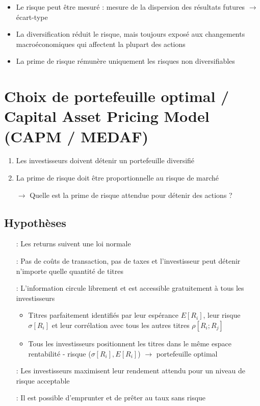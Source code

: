 \begin{itemize}
    \item Le risque peut être mesuré : mesure de la dispersion des résultats futures $\rightarrow$ écart-type
    \item La diversification réduit le risque, mais toujours exposé aux changements macroéconomiques qui affectent la plupart des actions
    \item La prime de risque rémunère uniquement les risques non diversifiables
\end{itemize}

\chapter{Choix de portefeuille optimal / Capital Asset Pricing Model (CAPM / MEDAF)}

\begin{enumerate}
    \item Les investisseurs doivent détenir un portefeuille diversifié
    \item La prime de risque doit être proportionnelle au risque de marché
    \item[$\rightarrow$] Quelle est la prime de risque attendue pour détenir des actions ?
\end{enumerate}

\section{Hypothèses}

\begin{enumerate}
    \item[\textblue{H1}]: Les returns suivent une loi normale
    \item[\textblue{H2}]: Pas de coûts de transaction, pas de taxes et l'investisseur peut détenir n'importe quelle quantité de titres
    \item[\textblue{H3}]: L'information circule librement et est accessible gratuitement à tous les investisseurs
    \begin{itemize}
        \item Titres parfaitement identifiés par leur espérance $E[R_i]$, leur risque $\sigma [R_i]$ et leur corrélation avec tous les autres titres $\rho [R_i;R_j]$
        \item Tous les investisseurs positionnent les titres dans le même espace rentabilité - risque ($\sigma [R_i], E[R_i]$) $\rightarrow$ portefeuille optimal
    \end{itemize}
    \item[\textblue{H4}]: Les investisseurs maximisent leur rendement attendu pour un niveau de risque acceptable
    \item[\textblue{H5}]: Il est possible d'emprunter et de prêter au taux sans risque
\end{enumerate}

